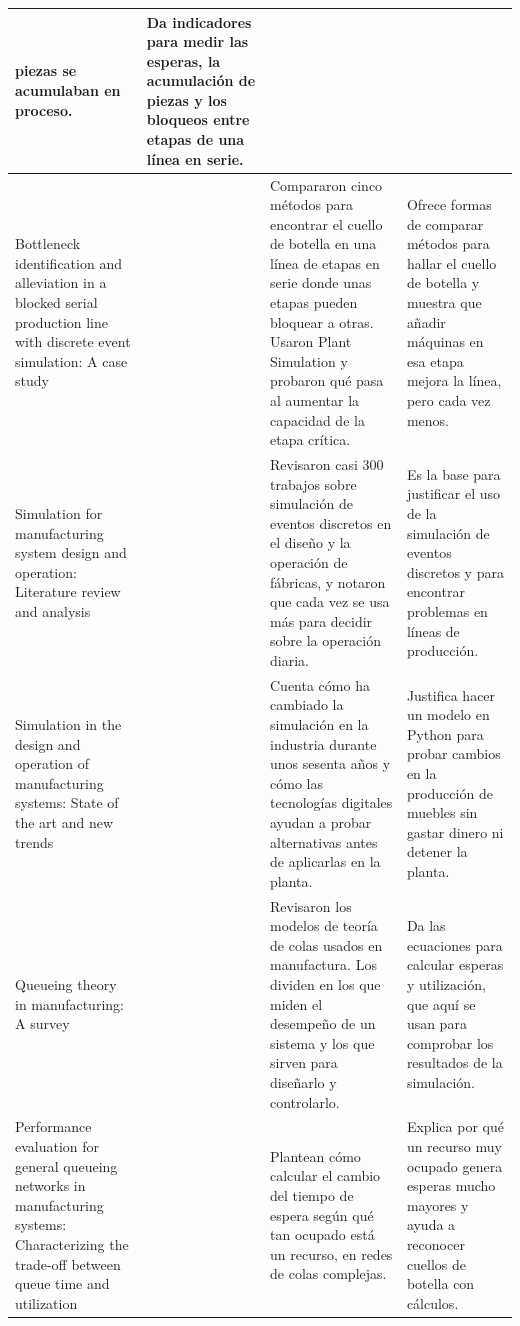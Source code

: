 \documentclass[conference,a4paper]{IEEEtran}
\begin{document}
{\begin{longtable}{|L{4.2cm}|C{1.0cm}|L{6.3cm}|L{5.4cm}|}
piezas se acumulaban en proceso. & Da indicadores para medir las esperas, la acumulación de
piezas y los bloqueos entre etapas de una línea en serie. \\ \hline
Bottleneck identification and alleviation in a blocked serial production line with discrete
event simulation: A case study & \cite{li2020} & Compararon cinco métodos para encontrar el
cuello de botella en una línea de etapas en serie donde unas etapas pueden bloquear a otras.
Usaron Plant Simulation y probaron qué pasa al aumentar la capacidad de la etapa crítica. &
Ofrece formas de comparar métodos para hallar el cuello de botella y muestra que añadir
máquinas en esa etapa mejora la línea, pero cada vez menos. \\ \hline
Simulation for manufacturing system design and operation: Literature review and analysis &
\cite{negahban2014} & Revisaron casi 300 trabajos sobre simulación de eventos discretos en el
diseño y la operación de fábricas, y notaron que cada vez se usa más para decidir sobre la
operación diaria. & Es la base para justificar el uso de la simulación de eventos discretos y
para encontrar problemas en líneas de producción. \\ \hline
Simulation in the design and operation of manufacturing systems: State of the art and new
trends & \cite{mourtzis2020} & Cuenta cómo ha cambiado la simulación en la industria durante
unos sesenta años y cómo las tecnologías digitales ayudan a probar alternativas antes de
aplicarlas en la planta. & Justifica hacer un modelo en Python para probar cambios en la
producción de muebles sin gastar dinero ni detener la planta. \\ \hline
Queueing theory in manufacturing: A survey & \cite{govil1999} & Revisaron los modelos de
teoría de colas usados en manufactura. Los dividen en los que miden el desempeño de un
sistema y los que sirven para diseñarlo y controlarlo. & Da las ecuaciones para calcular
esperas y utilización, que aquí se usan para comprobar los resultados de la simulación. \\
\hline
Performance evaluation for general queueing networks in manufacturing systems:
Characterizing the trade-off between queue time and utilization & \cite{wu2012} & Plantean
cómo calcular el cambio del tiempo de espera según qué tan ocupado está un recurso, en redes
de colas complejas. & Explica por qué un recurso muy ocupado genera esperas mucho mayores y
ayuda a reconocer cuellos de botella con cálculos. \\ \hline
\end{longtable}
}
\end{document}

